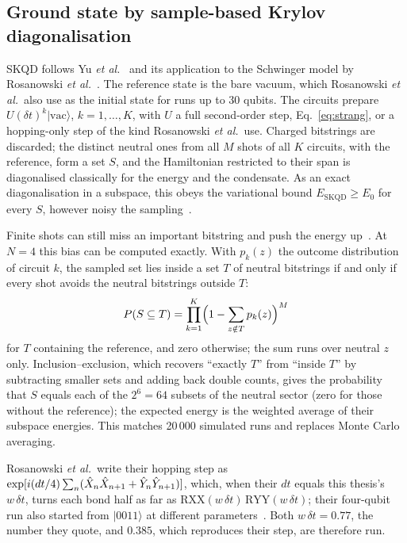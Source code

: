 \subsection{Ground state by sample-based Krylov diagonalisation}
\label{sec:skqd}

SKQD follows Yu \emph{et al.}~\cite{yu2025} and its application to the
Schwinger model by Rosanowski \emph{et al.}~\cite{rosanowski2025}. The
reference state is the bare vacuum, which Rosanowski \emph{et al.}\ also use as
the initial state for runs up to 30 qubits. The circuits prepare $U(\delta
t)^k|\mathrm{vac}\rangle$, $k = 1,\dots,K$, with $U$ a full second-order step,
Eq.~\eqref{eq:strang}, or a hopping-only step of the kind Rosanowski \emph{et
al.}\ use. Charged bitstrings are discarded; the distinct neutral ones from all
$M$ shots of all $K$ circuits, with the reference, form a set $S$, and the
Hamiltonian restricted to their span is diagonalised classically for the energy
and the condensate. As an exact diagonalisation in a subspace, this obeys the
variational bound $E_{\mathrm{SKQD}} \ge E_0$ for every $S$, however noisy the
sampling~\cite{kanno2023}.

Finite shots can still miss an important bitstring and push the energy
up~\cite{miura2026}. At $N = 4$ this bias can be computed exactly. With $p_k(z)$
the outcome distribution of circuit $k$, the sampled set lies inside a set $T$
of neutral bitstrings if and only if every shot avoids the neutral bitstrings
outside $T$:
\begin{equation}
  \label{eq:skqd}
  P(S \subseteq T) = \prod_{k=1}^{K}\Bigl(1 - \sum_{z \notin T} p_k(z)\Bigr)^{M}
\end{equation}
for $T$ containing the reference, and zero otherwise; the sum runs over
neutral $z$ only. Inclusion--exclusion,
which recovers ``exactly $T$'' from ``inside $T$'' by subtracting smaller sets
and adding back double counts, gives the probability that $S$ equals each of
the $2^6 = 64$ subsets of the neutral sector (zero for those without the
reference); the expected energy is the weighted average of their
subspace energies. This matches 20\,000 simulated runs and replaces Monte Carlo
averaging.

Rosanowski \emph{et al.}\ write their hopping step as
$\exp[i(dt/4)\sum_n(\hat{X}_{n}\hat{X}_{n+1} + \hat{Y}_{n}\hat{Y}_{n+1})]$, which, when their
$dt$ equals this thesis's $w\,\delta t$, turns each bond half as far as
$\mathrm{RXX}(w\,\delta t)\,\mathrm{RYY}(w\,\delta t)$; their four-qubit run
also started from $|0011\rangle$ at different parameters~\cite{rosanowski2025}.
Both $w\,\delta t = 0.77$, the number they quote, and $0.385$, which
reproduces their step, are therefore run.
